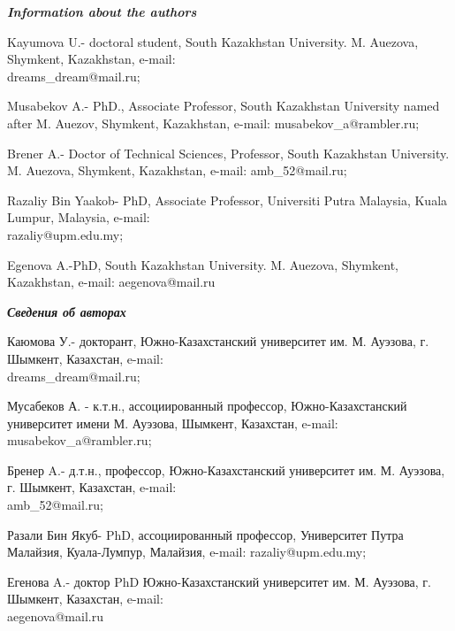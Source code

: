 \begin{authorinfo}
\emph{{\bfseries Information about the authors}}

Kayumova U.- doctoral student, South Kazakhstan University. M. Auezova,
Shymkent, Kazakhstan, e-mail: \\dreams\_dream@mail.ru;

Musabekov A.- PhD., Associate Professor, South Kazakhstan University
named after M. Auezov, Shymkent, Kazakhstan,
e-mail: musabekov\_a@rambler.ru;

Brener A.- Doctor of Technical Sciences, Professor, South Kazakhstan
University. M. Auezova, Shymkent, Kazakhstan, e-mail: amb\_52@mail.ru;

Razaliy Bin Yaakob- PhD, Associate Professor, Universiti Putra Malaysia,
Kuala Lumpur, Malaysia, e-mail: \\razaliy@upm.edu.my;

Egenova A.-PhD, South Kazakhstan University. M. Auezova, Shymkent,
Kazakhstan, e-mail: aegenova@mail.ru

\emph{{\bfseries Сведения об авторах}}

Каюмова У.- докторант, Южно-Казахстанский университет им. М. Ауэзова, г.
Шымкент, Казахстан, e-mail: \\dreams\_dream@mail.ru;

Мусабеков А. - к.т.н., ассоциированный профессор, Южно-Казахстанский
университет имени М. Ауэзова, Шымкент, Казахстан, e-mail: musabekov\_a@rambler.ru;

Бренер A.- д.т.н., профессор, Южно-Казахстанский университет им. М.
Ауэзова, г. Шымкент, Казахстан, e-mail: \\amb\_52@mail.ru;

Разали Бин Якуб- PhD, ассоциированный профессор, Университет Путра
Малайзия, Куала-Лумпур, Малайзия, e-mail: razaliy@upm.edu.my;

Егенова A.- доктор PhD Южно-Казахстанский университет им. М. Ауэзова, г.
Шымкент, Казахстан, e-mail: \\aegenova@mail.ru
\end{authorinfo}
